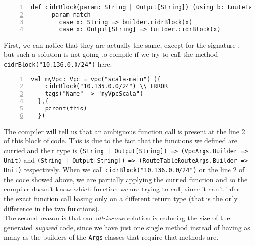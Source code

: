 \begin{minipage}{\linewidth}
\begin{lstlisting}[numbers=left, numberstyle=\tiny, numbersep=-5pt, stepnumber=1, linewidth=420pt]
  def cidrBlock(param: String | Output[String]) (using b: RouteTableRouteArgs.Builder): Unit =
      param match
        case x: String => builder.cidrBlock(x)
        case x: Output[String] => builder.cidrBlock(x)
\end{lstlisting}
\end{minipage}
First, we can notice that they are actually the same, except for the signature , but such a solution is not going to compile if we try to call the method \texttt{cidrBlock("10.136.0.0/24")} here:\\
\begin{minipage}{\linewidth}
\begin{lstlisting}[numbers=left, numberstyle=\tiny, numbersep=-5pt, stepnumber=1, linewidth=420pt]
  val myVpc: Vpc = vpc("scala-main") ({
    cidrBlock("10.136.0.0/24") \\ ERROR
    tags("Name" -> "myVpcScala")
  },{
    parent(this)
  })
\end{lstlisting}
\end{minipage}
The compiler will tell us that an ambiguous function call is present at the line 2 of this block of code.
This is due to the fact that the functions we defined are curried and their type is \texttt{(String | Output[String]) => (VpcArgs.Builder => Unit)} and \texttt{(String | Output[String]) => (RouteTableRouteArgs.Builder => Unit)} respectively.
When we call \texttt{cidrBlock("10.136.0.0/24")} on the line 2 of the code showed above, we are partially applying the curried function and so the compiler doesn't know which function we are trying to call, since it can't infer the exact function call basing only on a different return type (that is the only difference in the two functions).\\
The second reason is that our \textit{all-in-one} solution is reducing the size of the generated \textit{sugared} code, since we have just one single method instead of having as many as the builders of the \texttt{Args} classes that require that methods are.\\


